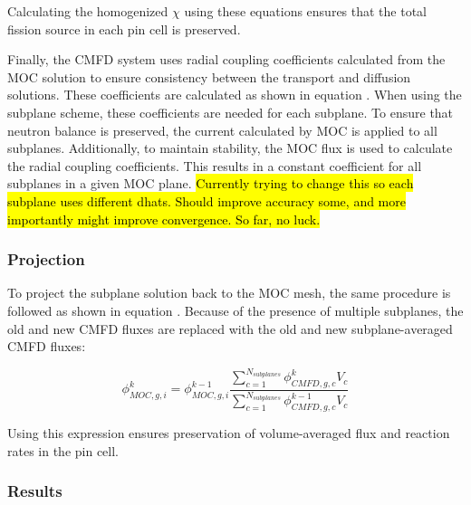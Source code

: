 Calculating the homogenized $\chi$ using these equations ensures that the total fission source in each pin cell is preserved.

Finally, the CMFD system uses radial coupling coefficients calculated from the MOC solution to ensure consistency between the transport and diffusion solutions.  These coefficients are calculated as shown in equation .  When using the subplane scheme, these coefficients are needed for each subplane.  To ensure that neutron balance is preserved, the current calculated by MOC is applied to all subplanes.  Additionally, to maintain stability, the MOC flux is used to calculate the radial coupling coefficients.  This results in a constant coefficient for all subplanes in a given MOC plane.  \hl{Currently trying to change this so each subplane uses different dhats.  Should improve accuracy some, and more importantly might improve convergence.  So far, no luck.}

\subsubsection{Projection}

To project the subplane solution back to the MOC mesh, the same procedure is followed as shown in equation .  Because of the presence of multiple subplanes, the old and new CMFD fluxes are replaced with the old and new subplane-averaged CMFD fluxes:

\begin{equation}
\phi_{MOC,g,i}^k = \phi_{MOC,g,i}^{k-1} \frac{\sum_{c=1}^{N_{subplanes}} \phi_{CMFD,g,c}^k V_c}{\sum_{c=1}^{N_{subplanes}} \phi_{CMFD,g,c}^{k-1} V_c}
\end{equation}

Using this expression ensures preservation of volume-averaged flux and reaction rates in the pin cell.

\subsubsection{Results}


